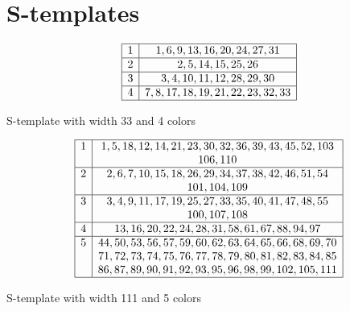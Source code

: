 \appendix


\section{S-templates}
\label{S-templates}

\renewcommand{\arraystretch}{1}
\vspace{-1.5ex}

\begin{table}[H]
\[
\begin{array}{|*{2}{c|}}
	\hline
	1 & 1, 6, 9, 13, 16, 20, 24, 27, 31 \\
	\hline
	2 & 2, 5, 14, 15, 25, 26 \\
	\hline
	3 & 3, 4, 10, 11, 12, 28, 29, 30 \\
	\hline
	4 & 7, 8, 17, 18, 19, 21, 22, 23, 32, 33 \\
	\hline
\end{array}
\]
\vspace{-3ex}
\caption{S-template with width 33 and 4 colors}
\vspace{-2ex}
\end{table}

\begin{table}[H]
\[
\begin{array}{|*{2}{c|}}
	\hline
	1 & 1, 5, 18, 12, 14 ,21, 23, 30, 32, 36, 39, 43, 45, 52, 103 \\
	 & 106, 110 \\
	\hline
	2 & 2, 6, 7, 10, 15, 18, 26, 29, 34, 37, 38, 42, 46, 51, 54 \\
	& 101, 104, 109 \\
	\hline
	3 & 3, 4, 9, 11, 17, 19, 25, 27, 33, 35, 40, 41, 47, 48, 55 \\
	& 100, 107, 108 \\
	\hline
	4 & 13, 16, 20, 22, 24, 28, 31, 58, 61, 67, 88, 94, 97 \\
	\hline
	5 & 44, 50, 53, 56, 57, 59, 60, 62, 63, 64, 65, 66, 68, 69, 70\\
	& 71, 72, 73, 74, 75, 76, 77, 78, 79, 80, 81, 82, 83, 84, 85\\
	& 86, 87, 89, 90, 91, 92, 93, 95, 96, 98, 99, 102, 105, 111 \\
	\hline
\end{array}
\]
\vspace{-3ex}
\caption{S-template with width 111 and 5 colors}
\vspace{-2ex}
\end{table}

